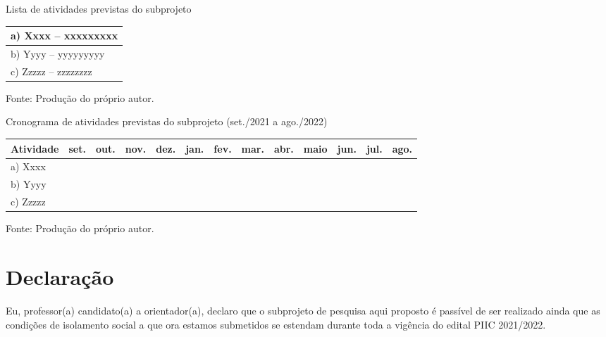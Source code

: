 \documentclass[10pt, a4paper]{article}
\begin{document}
\begin{quadro}[h]
	\centering
	\caption{Lista de atividades previstas do subprojeto}
	\label{qdr-atividades}
	\begin{tabular}{|p{145mm}|}
	\hline
	a) Xxxx -- xxxxxxxxx \\
	\hline
	b) Yyyy -- yyyyyyyyy \\
	\hline
	c) Zzzzz -- zzzzzzzz \\
	\hline
	\end{tabular}
	\caption*{Fonte: Produção do próprio autor.}
\end{quadro}

\begin{quadro}[h]
	\centering
	\caption{Cronograma de atividades previstas do subprojeto (set./2021 a ago./2022)}
	\label{qdr-cronograma}
	\begin{tabular}{|p{2.7cm}|l|l|l|l|l|l|l|l|l|l|l|l|}
	\hline
	Atividade & set. & out. & nov. & dez. & jan. & fev. & mar. & abr. & maio & jun. & jul. & ago. \\
	\hline
	a) Xxxx &   &   &   &    &  &   &   &   &   &   &   &  \\
	\hline
	b) Yyyy &   &   &   &   &   &   &    &    &   &   &   &  \\
	\hline
	c) Zzzzz &   &   &   &   &   &   &   &   &    &   &  & \\
	\hline
	\end{tabular}
	\caption*{Fonte: Produção do próprio autor.}
\end{quadro}



\section*{Declaração}

Eu, professor(a) candidato(a) a orientador(a), declaro que o subprojeto de pesquisa aqui proposto é passível de ser realizado ainda que as condições de isolamento social a que ora estamos submetidos se estendam durante toda a vigência do edital PIIC 2021/2022.


%



\end{document}
